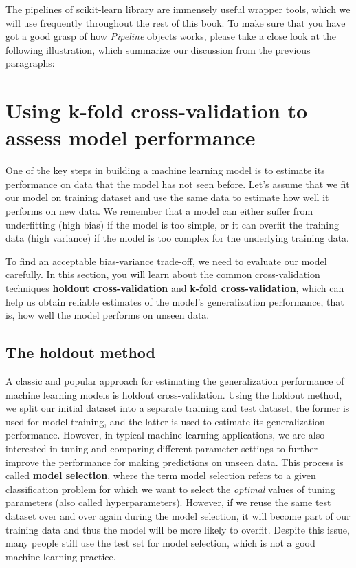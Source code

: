 \documentclass[11pt]{article}
\begin{document}
The pipelines of scikit-learn library are immensely useful wrapper
tools, which we will use frequently throughout the rest of this book. To
make sure that you have got a good grasp of how \emph{Pipeline} objects
works, please take a close look at the following illustration, which
summarize our discussion from the previous paragraphs:

    \section{Using k-fold cross-validation to assess model
performance}\label{using-k-fold-cross-validation-to-assess-model-performance}

    One of the key steps in building a machine learning model is to estimate
its performance on data that the model has not seen before. Let's assume
that we fit our model on training dataset and use the same data to
estimate how well it performs on new data. We remember that a model can
either suffer from underfitting (high bias) if the model is too simple,
or it can overfit the training data (high variance) if the model is too
complex for the underlying training data.

To find an acceptable bias-variance trade-off, we need to evaluate our
model carefully. In this section, you will learn about the common
cross-validation techniques \textbf{holdout cross-validation} and
\textbf{k-fold cross-validation}, which can help us obtain reliable
estimates of the model's generalization performance, that is, how well
the model performs on unseen data.

    \subsection{The holdout method}\label{the-holdout-method}

    A classic and popular approach for estimating the generalization
performance of machine learning models is holdout cross-validation.
Using the holdout method, we split our initial dataset into a separate
training and test dataset, the former is used for model training, and
the latter is used to estimate its generalization performance. However,
in typical machine learning applications, we are also interested in
tuning and comparing different parameter settings to further improve the
performance for making predictions on unseen data. This process is
called \textbf{model selection}, where the term model selection refers
to a given classification problem for which we want to select the
\emph{optimal} values of tuning parameters (also called
hyperparameters). However, if we reuse the same test dataset over and
over again during the model selection, it will become part of our
training data and thus the model will be more likely to overfit. Despite
this issue, many people still use the test set for model selection,
which is not a good machine learning practice.
\end{document}
